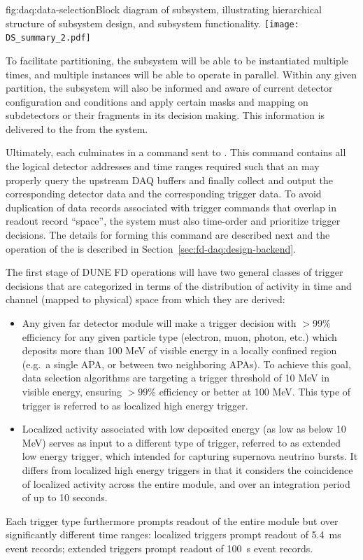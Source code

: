 \begin{dunefigure}{fig:daq:data-selection}{Block diagram of  
     subsystem, illustrating hierarchical structure of
    subsystem design, and subsystem functionality.}
  \texttt{[image: DS\_summary\_2.pdf]}
\end{dunefigure}

To facilitate partitioning, the  subsystem will be
able to be instantiated multiple times, and multiple instances will be
able to operate in parallel. Within any
given partition, the  subsystem will also be
informed and aware of current detector configuration and conditions and
apply certain masks and mapping on subdetectors or their fragments in
its decision making. This information is delivered to the
 from the  system.

Ultimately, each  culminates in a command sent to . 
This command contains all the logical detector addresses and time ranges
required such that an  may properly query the upstream DAQ
buffers and finally collect and output the corresponding detector data
and the corresponding trigger data. To avoid duplication of data
records associated with trigger commands that overlap in readout
record ``space'', the  system must also time-order and
prioritize trigger decisions. The details for forming this
command are described next and the operation of the  is
described in Section~\ref{sec:fd-daq:design-backend}.

The first stage of DUNE FD operations will have two general classes of trigger
decisions that are categorized in terms of the distribution of activity
in time and channel (mapped to physical) space from which they are derived: 
\begin{itemize}
\item Any given far detector module will make a 
  trigger decision with $>$99\% efficiency for any given particle
  type (electron, muon, photon, etc.) 
  which deposits more than 100 MeV of visible energy in a locally
  confined region (e.g.~a single APA, or between two neighboring APAs). To achieve this
  goal, data selection algorithms are targeting a trigger threshold of
  10 MeV in visible energy, ensuring $>99$\% efficiency or better
  at 100 MeV. 
  This type of trigger is referred to as localized high
  energy trigger.
\item    Localized activity associated with low deposited energy (as
  low as below 10 MeV) serves as input to a different type of trigger,
  referred to as extended low energy trigger, which intended for
  capturing supernova neutrino bursts. It differs from localized high
  energy triggers in that it considers the coincidence of localized
  activity across the entire module, and over an integration period of up to 10
  seconds.
\end{itemize}
Each trigger type furthermore prompts readout
    of the entire module but over significantly different time
    ranges: localized triggers prompt readout of \SI{5.4}{\milli\second} event records; extended
    triggers prompt readout of \SI{100}{\second} event records. 

